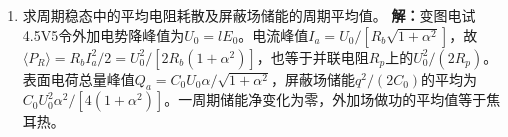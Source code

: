 \documentclass[UTF8,fontset=fandol,a4paper,11pt]{ctexart}
\begin{document}
\begin{enumerate}
\item 求周期稳态中的平均电阻耗散及屏蔽场储能的周期平均值。
\textbf{解：}变图电试4.5V5令外加电势降峰值为$U_0=lE_0$。电流峰值$I_a=U_0/[R_b\sqrt{1+\alpha^2}]$，故$\langle P_R\rangle=R_bI_a^2/2=U_0^2/[2R_b(1+\alpha^2)]$，也等于并联电阻$R_p$上的$U_0^2/(2R_p)$。表面电荷总量峰值$Q_a=C_0U_0\alpha/\sqrt{1+\alpha^2}$，屏蔽场储能$q^2/(2C_0)$的平均为$C_0U_0^2\alpha^2/[4(1+\alpha^2)]$。一周期储能净变化为零，外加场做功的平均值等于焦耳热。
\begin{center}\begin{minipage}{.98\linewidth}\centering
{}
\end{minipage}
\end{center}
\end{enumerate}
\end{document}
